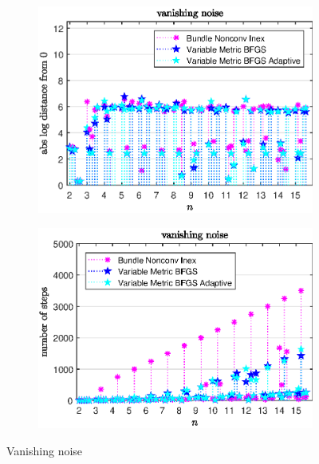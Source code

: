 \begin{figure}[H]
	\begin{subfigure}{0.49\textwidth}
		\includegraphics[width=\textwidth]{Pictures/Plots/vanishing_noise.eps}%
	\end{subfigure}
	\begin{subfigure}{0.49\textwidth}
		\includegraphics[width=\textwidth]{Pictures/Plots/steps_vanishing_noise.eps}%
	\end{subfigure}
	\caption{Vanishing noise}%
	\label{fig_van_noise}%
\end{figure}

